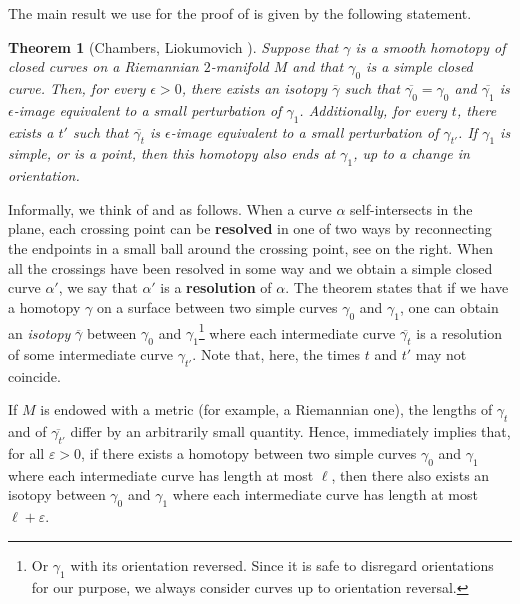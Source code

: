 \documentclass{article}
\newtheorem{theorem}{Theorem}[section]
\begin{document}
The main result we use for the proof of  is given by the following statement.

\begin{theorem}[Chambers, Liokumovich {\cite[Theorem 1.1']{Chambers_homo-isotopy}}]\label{Chambers_homo-isotopy}
Suppose that $\gamma$ is a smooth homotopy of closed curves on a Riemannian $2$-manifold $M$ and that $\gamma_0$ is a simple closed curve. Then, for every $\epsilon > 0$, there exists an isotopy $\overline{\gamma}$ such that $\overline{\gamma_0} = \gamma_0$ and $\overline{\gamma_1}$ is $\epsilon$-image equivalent to a small perturbation of $\gamma_1$. Additionally, for every $t$, there exists a $t'$ such that $\overline{\gamma_t}$ is $\epsilon$-image equivalent to a small perturbation of $\gamma_{t'}$. If $\gamma_1$ is simple, or is a point, then this homotopy also ends at $\gamma_1$, up to a change in orientation.
\end{theorem}

Informally, we think of  and  as follows. When a curve $\alpha$ self-intersects in the plane, each crossing point can be \textbf{resolved} in one of two ways by reconnecting the endpoints in a small ball around the crossing point, see  on the right. When all the crossings have been resolved in some way and we obtain a simple closed curve $\alpha'$, we say that $\alpha'$ is a \textbf{resolution} of $\alpha$. The theorem states that if we have a homotopy $\gamma$ on a surface between two simple curves $\gamma_0$ and $\gamma_1$, one can obtain an \emph{isotopy} $\overline{\gamma}$ between $\gamma_0$ and $\gamma_1$\footnote{Or $\gamma_1$ with its orientation reversed. Since it is safe to disregard orientations for our purpose, we always consider curves up to orientation reversal.} where each intermediate curve $\overline{\gamma_t}$ is a resolution of some intermediate curve $\gamma_{t'}$. Note that, here, the times $t$ and $t'$ may not coincide. 

If $M$ is endowed with a metric (for example, a Riemannian one), the lengths of $\gamma_t$ and of $\overline{\gamma_{t'}}$ differ by an arbitrarily small quantity. Hence,  immediately implies that, for all $\varepsilon>0$, if there exists a homotopy between two simple curves $\gamma_0$ and $\gamma_1$ where each intermediate curve has length at most $\ell$, then there also exists an isotopy between $\gamma_0$ and $\gamma_1$ where each intermediate curve has length at most $\ell+\varepsilon$.
\end{document}
